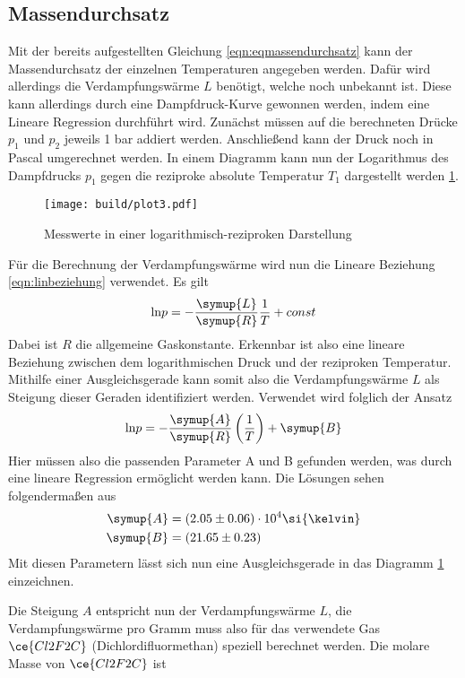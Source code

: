 \subsection{Massendurchsatz}
Mit der bereits aufgestellten Gleichung \eqref{eqn:eqmassendurchsatz} kann der Massendurchsatz der einzelnen Temperaturen angegeben werden.
Dafür wird allerdings die Verdampfungswärme $L$ benötigt, welche noch unbekannt ist. Diese kann allerdings durch eine Dampfdruck-Kurve gewonnen werden, indem eine Lineare Regression durchführt wird.
Zunächst müssen auf die berechneten Drücke $p_{1}$ und $p_{2}$ jeweils 1 bar addiert werden. Anschließend kann der Druck noch in Pascal umgerechnet werden. In einem Diagramm kann nun der Logarithmus des Dampfdrucks $p_{1}$ gegen die reziproke absolute Temperatur $T_{1}$ dargestellt werden \ref{fig:plot3}.
\begin{figure}[h]
  \centering
  \texttt{[image: build/plot3.pdf]}
  \caption{Messwerte in einer logarithmisch-reziproken Darstellung}
  \label{fig:plot3}
\end{figure}
Für die Berechnung der Verdampfungswärme wird nun die Lineare Beziehung \eqref{eqn:linbeziehung} verwendet. Es gilt
\begin{equation}
\text{ln} p = - \frac{\symup{L}}{\symup{R}} \frac{1}{T} + const
\end{equation}
Dabei ist $R$ die allgemeine Gaskonstante. Erkennbar ist also eine lineare Beziehung zwischen dem logarithmischen Druck und der reziproken Temperatur.
Mithilfe einer Ausgleichsgerade kann somit also die Verdampfungswärme $L$ als Steigung dieser Geraden identifiziert werden.
Verwendet wird folglich der Ansatz
\begin{equation}
\text{ln} p = - \frac{\symup{A}}{\symup{R}} \left( \frac{1}{T} \right) + \symup{B} 
\end{equation}
Hier müssen also die passenden Parameter A und B gefunden werden, was durch eine lineare Regression ermöglicht werden kann.
Die Lösungen sehen folgendermaßen aus
\begin{align}
\symup{A} &= (2.05\pm0.06)\cdot 10^{4}{\si{\kelvin}} \\
\symup{B} &= (21.65\pm0.23)
\end{align}
Mit diesen Parametern lässt sich nun eine Ausgleichsgerade in das Diagramm \ref{fig:plot3} einzeichnen.
\begin{flushleft}
Die Steigung $A$ entspricht nun der Verdampfungswärme $L$, die Verdampfungswärme pro Gramm muss also für das verwendete Gas $\ce{Cl2F2C}$ (Dichlordifluormethan) speziell berechnet werden.
Die molare Masse von $\ce{Cl2F2C}$ ist
\end{flushleft}
